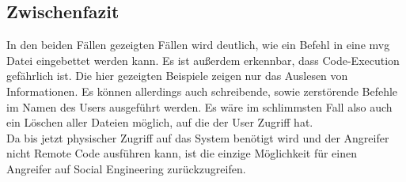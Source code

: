 
\subsection{Zwischenfazit}\label{subsec:zwischenfazit}

In den beiden Fällen gezeigten Fällen wird deutlich, wie ein Befehl in eine mvg Datei eingebettet werden kann.
Es ist außerdem erkennbar, dass Code-Execution gefährlich ist.
Die hier gezeigten Beispiele zeigen nur das Auslesen von Informationen.
Es können allerdings auch schreibende, sowie zerstörende Befehle im Namen des Users ausgeführt werden.
Es wäre im schlimmsten Fall also auch ein Löschen aller Dateien möglich, auf die der User Zugriff hat.
\\
Da bis jetzt physischer Zugriff auf das System benötigt wird und der Angreifer nicht Remote Code ausführen kann, ist die einzige Möglichkeit für einen Angreifer auf Social Engineering zurückzugreifen.\\
